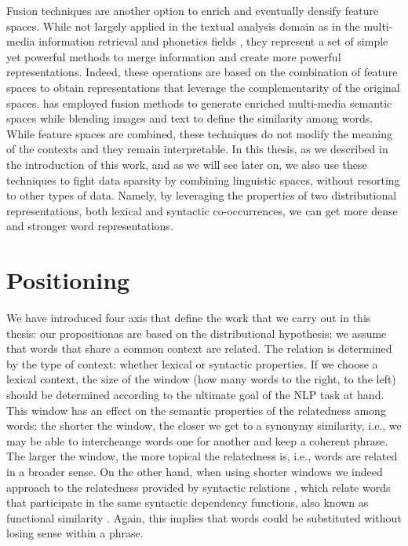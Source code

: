 Fusion techniques are another option to enrich and eventually densify feature spaces.  While not largely applied in the textual analysis domain as in the multi-media information retrieval and phonetics fields \cite{ozkan2010latent,Ah-PineCC15}, they represent a set of simple yet powerful methods to merge information and create more powerful representations. Indeed, these operations are based on the combination of feature spaces  to obtain representations that leverage the complementarity of the original spaces. \cite{bruni2014multimodal} has employed fusion methods to generate enriched multi-media semantic spaces while blending images and text to define the similarity among words. While feature spaces are combined, these techniques do not modify the meaning of the contexts and they remain interpretable. In this thesis, as we described in the introduction of this work, and as we will see later on, we also use these techniques to fight data sparsity by combining linguistic spaces, without resorting to other types of data. Namely,  by leveraging the properties of two distributional representations, both lexical and syntactic co-occurrences, we can get more dense and stronger  word representations. 


\section{Positioning}

We have introduced four axis that define the work that we carry out in this thesis: our propositionas are based on the distributional hypothesis: we assume that words that share a common context are related. The relation is determined by the type of context: whether lexical or syntactic properties. If we choose a lexical context, the size of the window (how many words to the right, to the left) should be determined according to the ultimate goal of the NLP task at hand. This window has an effect on the semantic properties of the relatedness among words: the shorter the window, the closer we get to a synonymy similarity, i.e., we may be able to intercheange words one for another and keep a coherent phrase. The larger the window, the more topical the relatedness is, i.e., words are related in a broader sense. On the other hand, when using shorter windows we indeed approach to the relatedness provided by syntactic relations \cite{sahlgren2006word}, which relate words that participate in the same syntactic dependency functions, also known as functional similarity \cite{LevyG14}. Again, this implies that words could be substituted without losing sense within a phrase.

